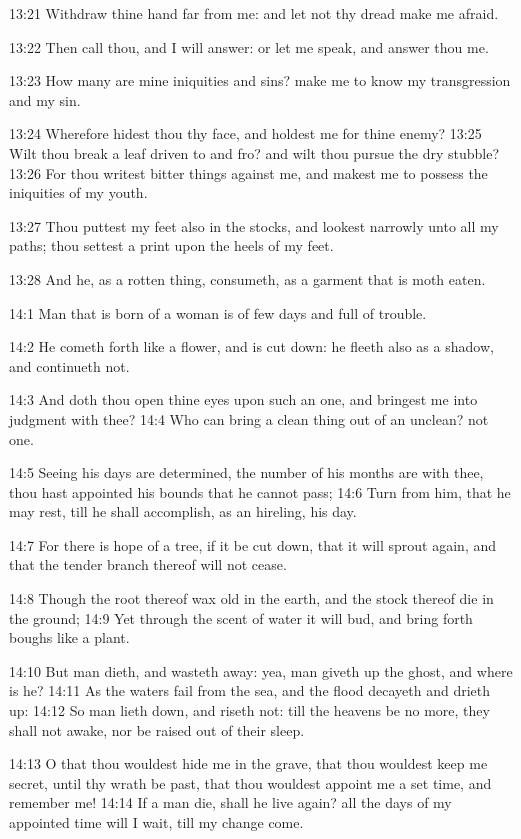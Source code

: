 13:21 Withdraw thine hand far from me: and let not thy dread make me
afraid.

13:22 Then call thou, and I will answer: or let me speak, and answer
thou me.

13:23 How many are mine iniquities and sins? make me to know my
transgression and my sin.

13:24 Wherefore hidest thou thy face, and holdest me for thine enemy?
13:25 Wilt thou break a leaf driven to and fro? and wilt thou pursue
the dry stubble?  13:26 For thou writest bitter things against me, and
makest me to possess the iniquities of my youth.

13:27 Thou puttest my feet also in the stocks, and lookest narrowly
unto all my paths; thou settest a print upon the heels of my feet.

13:28 And he, as a rotten thing, consumeth, as a garment that is moth
eaten.

14:1 Man that is born of a woman is of few days and full of trouble.

14:2 He cometh forth like a flower, and is cut down: he fleeth also as
a shadow, and continueth not.

14:3 And doth thou open thine eyes upon such an one, and bringest me
into judgment with thee?  14:4 Who can bring a clean thing out of an
unclean? not one.

14:5 Seeing his days are determined, the number of his months are with
thee, thou hast appointed his bounds that he cannot pass; 14:6 Turn
from him, that he may rest, till he shall accomplish, as an hireling,
his day.

14:7 For there is hope of a tree, if it be cut down, that it will
sprout again, and that the tender branch thereof will not cease.

14:8 Though the root thereof wax old in the earth, and the stock
thereof die in the ground; 14:9 Yet through the scent of water it will
bud, and bring forth boughs like a plant.

14:10 But man dieth, and wasteth away: yea, man giveth up the ghost,
and where is he?  14:11 As the waters fail from the sea, and the flood
decayeth and drieth up: 14:12 So man lieth down, and riseth not: till
the heavens be no more, they shall not awake, nor be raised out of
their sleep.

14:13 O that thou wouldest hide me in the grave, that thou wouldest
keep me secret, until thy wrath be past, that thou wouldest appoint me
a set time, and remember me!  14:14 If a man die, shall he live again?
all the days of my appointed time will I wait, till my change come.

